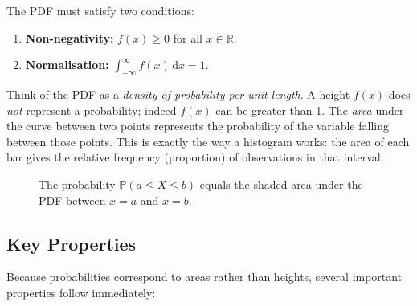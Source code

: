 \documentclass[12pt, a4paper, oneside]{book}
\theoremstyle{definition}
\theoremstyle{plain}
\theoremstyle{remark}
\newcommand{\Prob}{\mathbb{P}}
\newcommand{\R}{\mathbb{R}}
\begin{document}
The PDF must satisfy two conditions:
\begin{enumerate}[label=\textbf{(\roman*)}]
  \item \textbf{Non-negativity:} $f(x) \ge 0$ for all $x \in \R$.
  \item \textbf{Normalisation:} $\displaystyle\int_{-\infty}^{\infty} f(x)\,\mathrm{d}x = 1$.
\end{enumerate}

\begin{intuition}
Think of the PDF as a \emph{density of probability per unit length}.  A
height $f(x)$ does \emph{not} represent a probability; indeed $f(x)$ can be
greater than 1.  The \emph{area} under the curve between two points
represents the probability of the variable falling between those points.  
This is exactly the way a histogram works: the area of each bar gives the
relative frequency (proportion) of observations in that interval.
\end{intuition}

\begin{figure}[h]
\centering
{}
\caption{The probability $\Prob(a\le X\le b)$ equals the shaded area
  under the PDF between $x=a$ and $x=b$.}
\label{fig:pdf-area}
\end{figure}

\subsection{Key Properties}

Because probabilities correspond to areas rather than heights, several
important properties follow immediately:
\end{document}
